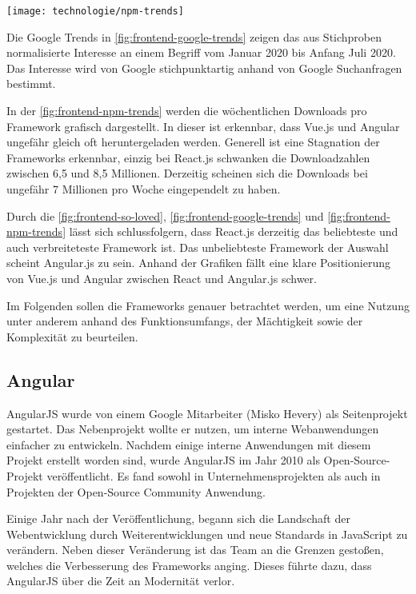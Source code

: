 \begin{center}
	\texttt{[image: technologie/npm-trends]}
	\label{fig:frontend-npm-trends}
\end{center}

Die Google Trends in \autoref{fig:frontend-google-trends} zeigen das aus Stichproben normalisierte Interesse an einem Begriff vom Januar 2020 bis Anfang Juli 2020. Das Interesse wird von Google stichpunktartig anhand von Google Suchanfragen bestimmt. \cite{googleHaufigGestellteFragen2020}

In der \autoref{fig:frontend-npm-trends} werden die wöchentlichen Downloads pro Framework grafisch dargestellt. In dieser ist erkennbar, dass Vue.js und Angular ungefähr gleich oft heruntergeladen werden. Generell ist eine Stagnation der Frameworks erkennbar, einzig bei React.js schwanken die Downloadzahlen zwischen 6,5 und 8,5 Millionen. Derzeitig scheinen sich die Downloads bei ungefähr 7 Millionen pro Woche eingependelt zu haben.

Durch die \autoref{fig:frontend-so-loved}, \autoref{fig:frontend-google-trends} und \autoref{fig:frontend-npm-trends} lässt sich schlussfolgern, dass React.js derzeitig das beliebteste und auch verbreiteteste Framework ist. Das unbeliebteste Framework der Auswahl scheint Angular.js zu sein. Anhand der Grafiken fällt eine klare Positionierung von Vue.js und Angular zwischen React und Angular.js schwer.

Im Folgenden sollen die Frameworks genauer betrachtet werden, um eine Nutzung unter anderem anhand des Funktionsumfangs, der Mächtigkeit sowie der Komplexität zu beurteilen.

\subsection{Angular}
AngularJS wurde von einem Google Mitarbeiter (Misko Hevery) als Seitenprojekt gestartet. Das Nebenprojekt wollte er nutzen, um interne Webanwendungen einfacher zu entwickeln. Nachdem einige interne Anwendungen mit diesem Projekt erstellt worden sind, wurde AngularJS im Jahr 2010 als Open-Source-Projekt veröffentlicht. Es fand sowohl in Unternehmensprojekten als auch in Projekten der Open-Source Community Anwendung.

Einige Jahr nach der Veröffentlichung, begann sich die Landschaft der Webentwicklung durch Weiterentwicklungen und neue Standards in JavaScript zu verändern. Neben dieser Veränderung ist das Team an die Grenzen gestoßen, welches die Verbesserung des Frameworks anging. Dieses führte dazu, dass AngularJS über die Zeit an Modernität verlor.

